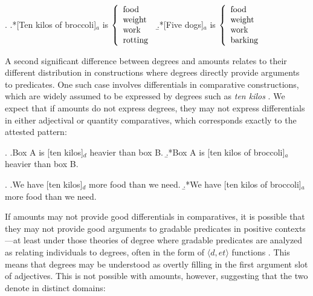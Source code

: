\documentclass[a4paper,12pt,twoside]{article}
\begin{document}
	\ex.
	\a.\label{data1:i}*[Ten kilos of broccoli]$_a$ is
	$\left\{\begin{array}{ l }
		\textnormal{food} \\
		\textnormal{weight} \\
		\textnormal{work} \\
		\textnormal{rotting} 
	\end{array}
	\right.$
	\b.\label{data1:j}*[Five dogs]$_a$ is
	$\left\{\begin{array}{ l }
		\textnormal{food} \\
		\textnormal{weight} \\
		\textnormal{work} \\
		\textnormal{barking} 
	\end{array}
	\right.$


    
	A second significant difference between degrees and amounts relates to their different distribution in constructions where degrees directly provide arguments to predicates. One such case involves differentials in comparative constructions, which are widely assumed to be expressed by degrees such as \textit{ten kilos} \citep{vonStechow:1984, Heim:2000}. We expect that if amounts do not express degrees, they may not express differentials in either adjectival or quantity comparatives, which corresponds exactly to the attested pattern:
	
		\ex.
		\a.Box A is [ten kilos]$_d$ heavier than box B.
		\b.*Box A is [ten kilos of broccoli]$_a$ heavier than box B.
		
		\ex. 
		\a.We have [ten kilos]$_d$ more food than we need.
		\b.*We have [ten kilos of broccoli]$_a$ more food than we need.
	
	If amounts may not provide good differentials in comparatives, it is possible that they may not provide good arguments to gradable predicates in positive contexts---at least under those theories of degree where gradable predicates are analyzed as relating individuals to degrees, often in the form of $\langle d,et\rangle$ functions \citep{Cresswell:1977, Kennedy:1999, Heim:2000}. This means that degrees may be understood as overtly filling in the first argument slot of adjectives. This is not possible with amounts, however, suggesting that the two denote in distinct domains:
\end{document}
